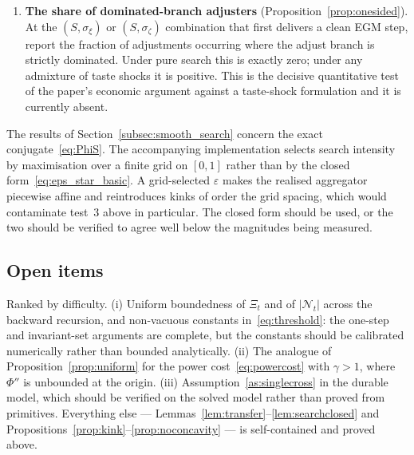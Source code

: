 \begin{enumerate}
    \item \textbf{The share of dominated-branch adjusters}
    (Proposition~\ref{prop:onesided}). At the $(S,\sigma_\xi)$ or
    $(S,\sigma_\zeta)$ combination that first delivers a clean EGM step, report the
    fraction of adjustments occurring where the adjust branch is strictly dominated.
    Under pure search this is exactly zero; under any admixture of taste shocks it is
    positive. This is the decisive quantitative test of the paper's economic argument
    against a taste-shock formulation and it is currently absent.
\end{enumerate}

\begin{remark}
\label{rem:implementation}
The results of Section~\ref{subsec:smooth_search} concern the exact
conjugate~\eqref{eq:PhiS}. The accompanying implementation selects search intensity by
maximisation over a finite grid on $[0,1]$ rather than by the closed
form~\eqref{eq:eps_star_basic}. A grid-selected $\varepsilon$ makes the realised
aggregator piecewise affine and reintroduces kinks of order the grid spacing, which
would contaminate test~3 above in particular. The closed form should be used, or the
two should be verified to agree well below the magnitudes being measured.
\end{remark}

\subsection{Open items}
\label{subsec:smooth_open}

Ranked by difficulty. (i) Uniform boundedness of $\Xi_t$ and of $|\mathcal{N}_t|$ across
the backward recursion, and non-vacuous constants in~\eqref{eq:threshold}: the one-step
and invariant-set arguments are complete, but the constants should be calibrated
numerically rather than bounded analytically. (ii) The analogue of
Proposition~\ref{prop:uniform} for the power cost~\eqref{eq:powercost} with $\gamma>1$,
where $\Phi''$ is unbounded at the origin. (iii)
Assumption~\ref{as:singlecross} in the durable model, which should be verified on the
solved model rather than proved from primitives. Everything else ---
Lemmas~\ref{lem:transfer}--\ref{lem:searchclosed} and
Propositions~\ref{prop:kink}--\ref{prop:noconcavity} --- is self-contained and proved
above.

